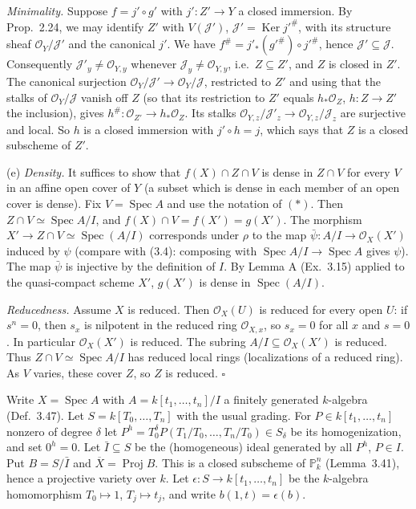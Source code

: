 \documentclass[11pt]{article}
\begin{document}
\emph{Minimality.} Suppose $f=j'\circ g'$ with $j':Z'\to Y$ a closed immersion. By Prop.~2.24, we may identify $Z'$ with $V(\mathcal{J}')$, $\mathcal{J}'=\operatorname{Ker}j'^\#$, with its structure sheaf $\mathcal{O}_Y/\mathcal{J}'$ and the canonical $j'$. We have $f^\#=j'_*(g'^\#)\circ j'^\#$, hence $\mathcal{J}'\subseteq\mathcal{J}$. Consequently $\mathcal{J}'_y\ne\mathcal{O}_{Y,y}$ whenever $\mathcal{J}_y\neq\mathcal{O}_{Y,y}$, i.e.\ $Z\subseteq Z'$, and $Z$ is closed in $Z'$. The canonical surjection $\mathcal{O}_Y/\mathcal{J}'\to\mathcal{O}_Y/\mathcal{J}$, restricted to $Z'$ and using that the stalks of $\mathcal{O}_Y/\mathcal{J}$ vanish off $Z$ (so that its restriction to $Z'$ equals $h_*\mathcal{O}_Z$, $h:Z\to Z'$ the inclusion), gives $h^\#:\mathcal{O}_{Z'}\to h_*\mathcal{O}_Z$. Its stalks $\mathcal{O}_{Y,z}/\mathcal{J}'_z\to\mathcal{O}_{Y,z}/\mathcal{J}_z$ are surjective and local. So $h$ is a closed immersion with $j'\circ h=j$, which says that $Z$ is a closed subscheme of $Z'$.

(e) \emph{Density.} It suffices to show that $f(X)\cap Z\cap V$ is dense in $Z\cap V$ for every $V$ in an affine open cover of $Y$ (a subset which is dense in each member of an open cover is dense). Fix $V=\operatorname{Spec}A$ and use the notation of $(\ast)$. Then $Z\cap V\simeq\operatorname{Spec}A/I$, and $f(X)\cap V=f(X')=g(X')$. The morphism $X'\to Z\cap V\simeq\operatorname{Spec}(A/I)$ corresponds under $\rho$ to the map $\bar\psi:A/I\to\mathcal{O}_X(X')$ induced by $\psi$ (compare with (3.4): composing with $\operatorname{Spec}A/I\to\operatorname{Spec}A$ gives $\psi$). The map $\bar\psi$ is injective by the definition of $I$. By Lemma A (Ex.~3.15) applied to the quasi-compact scheme $X'$, $g(X')$ is dense in $\operatorname{Spec}(A/I)$.

\emph{Reducedness.} Assume $X$ is reduced. Then $\mathcal{O}_X(U)$ is reduced for every open $U$: if $s^n=0$, then $s_x$ is nilpotent in the reduced ring $\mathcal{O}_{X,x}$, so $s_x=0$ for all $x$ and $s=0$. In particular $\mathcal{O}_X(X')$ is reduced. The subring $A/I\subseteq\mathcal{O}_X(X')$ is reduced. Thus $Z\cap V\simeq\operatorname{Spec}A/I$ has reduced local rings (localizations of a reduced ring). As $V$ varies, these cover $Z$, so $Z$ is reduced. \hfill$\square$

\pf
Write $X=\operatorname{Spec}A$ with $A=k[t_1,\dots,t_n]/I$ a finitely generated $k$-algebra (Def.~3.47). Let $S=k[T_0,\dots,T_n]$ with the usual grading. For $P\in k[t_1,\dots,t_n]$ nonzero of degree $\delta$ let $P^h=T_0^{\delta}P(T_1/T_0,\dots,T_n/T_0)\in S_\delta$ be its homogenization, and set $0^h=0$. Let $\bar I\subseteq S$ be the (homogeneous) ideal generated by all $P^h$, $P\in I$. Put $B=S/\bar I$ and $\overline X=\operatorname{Proj}B$. This is a closed subscheme of $\mathbb{P}^n_k$ (Lemma~3.41), hence a projective variety over $k$. Let $\epsilon:S\to k[t_1,\dots,t_n]$ be the $k$-algebra homomorphism $T_0\mapsto1$, $T_j\mapsto t_j$, and write $b(1,t)=\epsilon(b)$.
\end{document}
